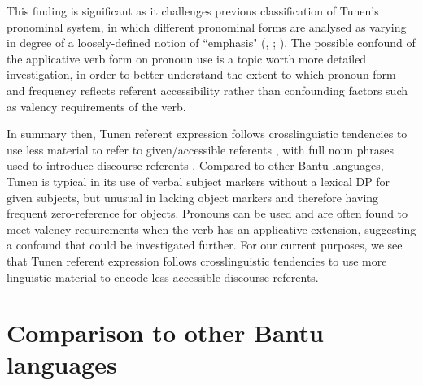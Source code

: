 \documentclass[output=paper,colorlinks,citecolor=brown
]{langscibook}
\begin{document}
This finding is significant as it challenges previous classification of Tunen's pronominal system, in which different pronominal forms are analysed as varying in degree of a loosely-defined notion of ``emphasis" (\citealt[128--130]{Dugast1971}, \citealt[49--51]{Isaac2007}; \citealt[97--100]{KerrFut}). The possible confound of the applicative verb form on pronoun use is a topic worth more detailed investigation, in order to better understand the extent to which pronoun form and frequency reflects referent accessibility rather than confounding factors such as valency requirements of the verb.

In summary then, Tunen referent expression follows crosslinguistic tendencies to use less material to refer to given/accessible referents \citep{GundelEtAl1993, Ariel2001}, with full noun phrases used to introduce discourse referents \citep{Isaac2007}. Compared to other Bantu languages, Tunen is typical in its use of verbal subject markers without a lexical DP for given subjects, but unusual in lacking object markers and therefore having frequent zero-reference for objects. Pronouns can be used and are often found to meet valency requirements when the verb has an applicative extension, suggesting a confound that could be investigated further. For our current purposes, we see that Tunen referent expression follows crosslinguistic tendencies to use more linguistic material to encode less accessible discourse referents.

\section{Comparison to other Bantu languages}\label{seccomparison}
\end{document}
